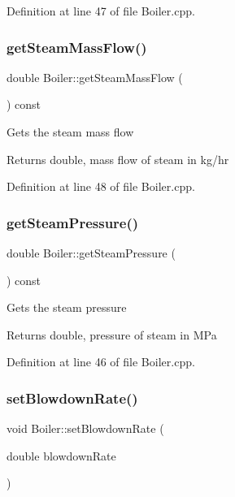 Definition at line 47 of file Boiler.\+cpp.

\mbox{\label{class_boiler_a4101e71234995558a451dcab145b5fc9}} 
\subsubsection{\texorpdfstring{get\+Steam\+Mass\+Flow()}{getSteamMassFlow()}}
{\footnotesize\ttfamily double Boiler\+::get\+Steam\+Mass\+Flow (\begin{DoxyParamCaption}{ }\end{DoxyParamCaption}) const}

Gets the steam mass flow \begin{DoxyReturn}{Returns}
double, mass flow of steam in kg/hr 
\end{DoxyReturn}


Definition at line 48 of file Boiler.\+cpp.

\mbox{\label{class_boiler_a99d4bbace6ef20bcbdc4b0cfcdc43213}} 
\subsubsection{\texorpdfstring{get\+Steam\+Pressure()}{getSteamPressure()}}
{\footnotesize\ttfamily double Boiler\+::get\+Steam\+Pressure (\begin{DoxyParamCaption}{ }\end{DoxyParamCaption}) const}

Gets the steam pressure \begin{DoxyReturn}{Returns}
double, pressure of steam in M\+Pa 
\end{DoxyReturn}


Definition at line 46 of file Boiler.\+cpp.

\mbox{\label{class_boiler_a66c0e4c577dbd3f52dcf202e69a08371}} 
\subsubsection{\texorpdfstring{set\+Blowdown\+Rate()}{setBlowdownRate()}}
{\footnotesize\ttfamily void Boiler\+::set\+Blowdown\+Rate (\begin{DoxyParamCaption}\item[{double}]{blowdown\+Rate }\end{DoxyParamCaption})}

